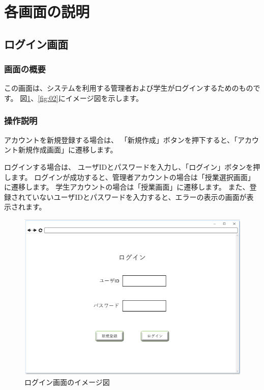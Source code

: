 \section{各画面の説明}
\subsection{ログイン画面}
\subsubsection{画面の概要}
この画面は、システムを利用する管理者および学生がログインするためのものです。
図\ref{fig:01}、\ref{fig:02}にイメージ図を示します。

\subsubsection{操作説明}
アカウントを新規登録する場合は、
「新規作成」ボタンを押下すると、「アカウント新規作成画面」に遷移します。

ログインする場合は、
ユーザIDとパスワードを入力し、「ログイン」ボタンを押します。
ログインが成功すると、管理者アカウントの場合は「授業選択画面」に遷移します。
学生アカウントの場合は「授業画面」に遷移します。
また、登録されていないユーザIDとパスワードを入力すると、エラーの表示の画面が表示されます。

\newpage
\begin{figure}[phtbp]
  \begin{center}
    \includegraphics[width=1\linewidth,clip]{./img/01.png}
    \caption{ログイン画面のイメージ図}\label{fig:01}
  \end{center}
\end{figure}

